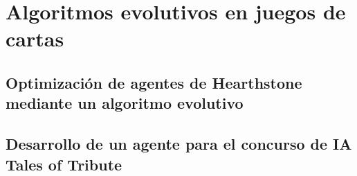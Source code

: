 \section{Algoritmos evolutivos en juegos de cartas} \label{sec:trabajos_relacionados}


\subsection{Optimización de agentes de Hearthstone mediante un algoritmo evolutivo}


\subsection{Desarrollo de un agente para el concurso de IA Tales of Tribute}
